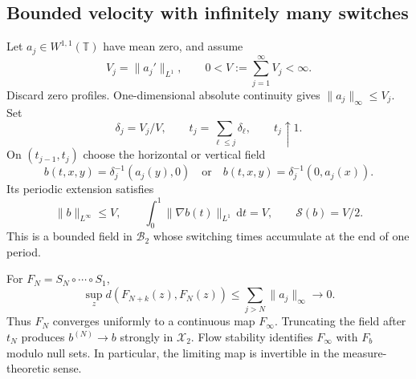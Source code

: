 \documentclass[review,12pt,times,a4paper,nopreprintline]{elsarticle}
\theoremstyle{plain}
\theoremstyle{definition}
\theoremstyle{remark}
\newcommand{\T}{\mathbb T}
\newcommand{\B}{\mathscr B}
\newcommand{\X}{\mathscr X}
\newcommand{\dd}{\,\mathrm d}
\newcommand{\action}{\mathcal S}
\numberwithin{equation}{section}
\begin{document}
\subsection{Bounded velocity with infinitely many switches}
Let $a_j\in W^{1,1}(\T)$ have mean zero, and assume
\begin{equation}\label{eq:sumV}
 V_j=\|a_j'\|_{L^1},\qquad 0<V:=\sum_{j=1}^\infty V_j<\infty.
\end{equation}
Discard zero profiles. One-dimensional absolute continuity gives $\|a_j\|_\infty\leq V_j$. Set
\[
 \delta_j=V_j/V,\qquad t_j=\sum_{\ell\leq j}\delta_\ell,\qquad t_j\uparrow1.
\]
On $(t_{j-1},t_j)$ choose the horizontal or vertical field
\begin{equation}\label{eq:switchfield}
 b(t,x,y)=\delta_j^{-1}(a_j(y),0)
 \quad\text{or}\quad
 b(t,x,y)=\delta_j^{-1}(0,a_j(x)).
\end{equation}
Its periodic extension satisfies
\begin{equation}\label{eq:switchbudget}
 \|b\|_{L^\infty}\leq V,\qquad
 \int_0^1\|\nabla b(t)\|_{L^1}\dd t=V,\qquad
 \action(b)=V/2.
\end{equation}
This is a bounded field in $\B_2$ whose switching times accumulate at the end of one period.

For $F_N=S_N\circ\cdots\circ S_1$,
\[
 \sup_zd(F_{N+k}(z),F_N(z))\leq\sum_{j>N}\|a_j\|_\infty\longrightarrow0.
\]
Thus $F_N$ converges uniformly to a continuous map $F_\infty$. Truncating the field after $t_N$ produces $b^{(N)}\to b$ strongly in $\X_2$. Flow stability identifies $F_\infty$ with $F_b$ modulo null sets. In particular, the limiting map is invertible in the measure-theoretic sense.
\end{document}
